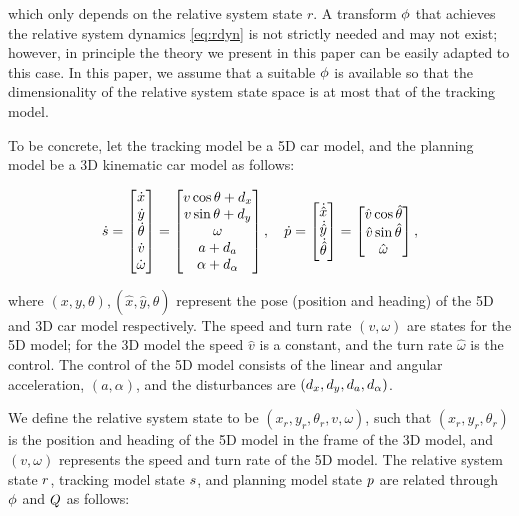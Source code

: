 \noindent which only depends on the relative system state $r$.
A transform $\phi$ that achieves the relative system dynamics \eqref{eq:rdyn} is not strictly needed and may not exist; however, in principle the theory we present in this paper can be easily adapted to this case.
In this paper, we assume that a suitable $\phi$ is available so that the dimensionality of the relative system state space is at most that of the tracking model.

To be concrete, let the tracking model be a 5D car model, and the planning model be a 3D kinematic car model as follows:

\begin{equation}
\label{eq:5D_and_3D_dyn}
\dot \tstate = 
\begin{bmatrix}
\dot x\\
\dot y\\
\dot\theta\\
\dot v\\
\dot \omega
\end{bmatrix} =
\begin{bmatrix}
v \cos \theta + \dstb_x\\
v \sin \theta + \dstb_y\\
\omega \\
a + \dstb_a\\
\alpha + \dstb_\alpha
\end{bmatrix}, \quad
\dot \pstate = 
\begin{bmatrix}
\dot {\hat x}\\
\dot {\hat y}\\
\dot {\hat \theta}
\end{bmatrix}
=
\begin{bmatrix}
\hat v \cos \hat\theta\\
\hat v \sin \hat\theta\\
\hat \omega
\end{bmatrix},
\end{equation}

\noindent where $(x,y,\theta),(\hat x, \hat y, \hat\theta)$ represent the pose (position and heading) of the 5D and 3D car model respectively.
The speed and turn rate $(v, \omega)$ are states for the 5D model; for the 3D model the speed $\hat v$ is a constant, and the turn rate $\hat \omega$ is the control.
The control of the 5D model consists of the linear and angular acceleration, $(a, \alpha)$, and the disturbances are $(d_x, d_y, d_a, d_\alpha)$.

We define the relative system state to be $(x_r, y_r, \theta_r, v, \omega)$, such that $(x_r, y_r, \theta_r)$ is the position and heading of the 5D model  in the frame of the 3D model, and $(v, \omega)$ represents the speed and turn rate of the 5D model.
The relative system state $r$, tracking model state $s$, and planning model state $p$ are related through $\phi$ and $Q$ as follows:

